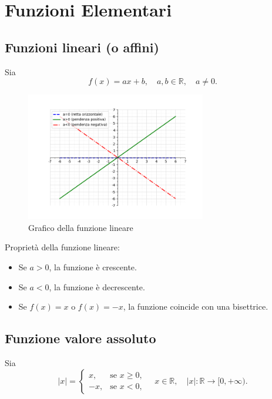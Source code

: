 \section{Funzioni Elementari}
\subsection{Funzioni lineari (o affini)}

Sia 
\[
f(x) = a x + b, \quad a, b \in \mathbb{R}, \quad a \neq 0.
\]

\begin{figure}[h]
    \centering
    \includegraphics[width=0.7\textwidth]{./img/lineari_combinato.png}
    \caption{Grafico della funzione lineare}
    \label{fig:funzione_lineare}
\end{figure}

Proprietà della funzione lineare:
\begin{itemize}
    \item Se $a > 0$, la funzione è crescente.
    \item Se $a < 0$, la funzione è decrescente.
    \item Se $f(x) = x$ o $f(x) = -x$, la funzione coincide con una bisettrice.
\end{itemize}

\subsection{Funzione valore assoluto}

Sia
\[
|x| = 
\begin{cases} 
x, & \text{se } x \ge 0, \\
-x, & \text{se } x < 0,
\end{cases}
\quad x \in \mathbb{R}, \quad |x| : \mathbb{R} \to [0, +\infty).
\]

